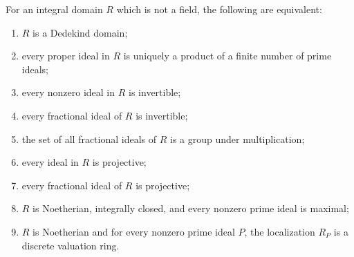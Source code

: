 For an integral domain $R$ which is not a field, the following are equivalent:
\begin{enumerate}
  \item $R$ is a Dedekind domain;
  \item every proper ideal in $R$ is uniquely a product of a finite number of prime ideals;
  \item every nonzero ideal in $R$ is invertible;
  \item every fractional ideal of $R$ is invertible;
  \item the set of all fractional ideals of $R$ is a group under multiplication;
  \item every ideal in $R$ is projective;
  \item every fractional ideal of $R$ is projective;
  \item $R$ is Noetherian, integrally closed, and every nonzero prime ideal is maximal;
  \item $R$ is Noetherian and for every nonzero prime ideal $P$, the localization $R_P$ is a discrete valuation ring.
\end{enumerate}
